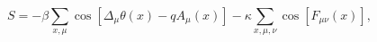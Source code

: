 \begin{equation}
\label{Higgs}
S=-\beta\sum_{x,\mu}\cos[\Delta_\mu\theta(x)-qA_\mu(x)]
-\kappa\sum_{x,\mu,\nu}\cos[F_{\mu\nu}(x)],
\end{equation}

